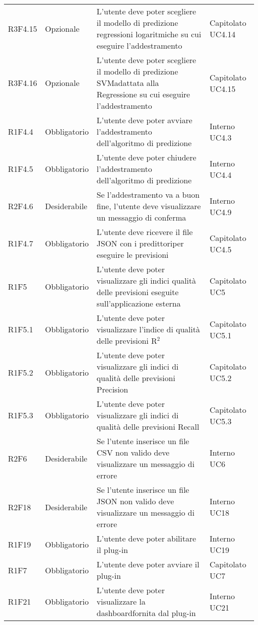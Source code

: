 \begin{longtable} {
		>{}p{24mm} 
		>{}p{32mm}
		>{}p{40mm} 
		>{}p{24.5mm}
		}
		R3F4.15 & Opzionale & L'utente deve poter scegliere il modello di predizione regressioni logaritmiche su cui eseguire l'addestramento & Capitolato UC4.14 \TBstrut \\
		R3F4.16 & Opzionale & L'utente deve poter scegliere il modello di predizione SVM\glosp adattata alla Regressione su cui eseguire l'addestramento & Capitolato UC4.15 \TBstrut \\				
		R1F4.4 & Obbligatorio & L'utente deve poter avviare l'addestramento dell'algoritmo di predizione & Interno UC4.3 \TBstrut \\ [2mm]
		R1F4.5 & Obbligatorio & L'utente deve poter chiudere l'addestramento dell'algoritmo di predizione & Interno UC4.4 \TBstrut \\ [2mm]		
		R2F4.6 & Desiderabile & Se l'addestramento va a buon fine, l'utente deve visualizzare un messaggio di conferma & Interno UC4.9 \TBstrut \\ [2mm]		
		R1F4.7 & Obbligatorio & L'utente deve ricevere il file JSON con i predittori\glosp per eseguire le previsioni & Capitolato UC4.5 \TBstrut \\ [2mm]
		R1F5 & Obbligatorio & L'utente deve poter visualizzare gli indici qualità delle previsioni eseguite sull'applicazione esterna & Capitolato UC5 \TBstrut \\ [2mm]
		R1F5.1 & Obbligatorio & L'utente deve poter visualizzare l'indice di qualità delle previsioni R$^{2}$\glo & Capitolato UC5.1 \TBstrut \\ [2mm]
		R1F5.2 & Obbligatorio & L'utente deve poter visualizzare gli indici di qualità delle previsioni Precision\glo & Capitolato UC5.2 \TBstrut \\ [2mm]
		R1F5.3 & Obbligatorio & L'utente deve poter visualizzare gli indici di qualità delle previsioni Recall\glo & Capitolato UC5.3 \TBstrut \\ [2mm]
		R2F6 & Desiderabile & Se l'utente inserisce un file CSV non valido deve visualizzare un messaggio di errore & Interno UC6 \TBstrut \\ [2mm]
		R2F18 & Desiderabile & Se l'utente inserisce un file JSON non valido deve visualizzare un messaggio di errore & Interno UC18 \TBstrut \\ [2mm]
		R1F19 & Obbligatorio & L'utente deve poter abilitare il plug-in & Interno UC19 \TBstrut \\ [2mm]
		R1F7 & Obbligatorio & L'utente deve poter avviare il plug-in & Capitolato UC7 \TBstrut \\ [2mm]
		R1F21 & Obbligatorio & L'utente deve poter visualizzare la dashboard\glosp fornita dal plug-in & Interno UC21 \TBstrut \\ [2mm]

\end{longtable}

